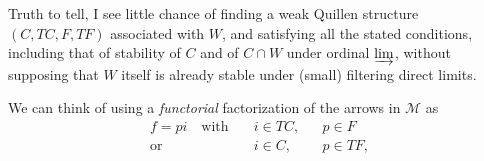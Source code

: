 \documentclass[11pt]{article}
\newcommand{\msp}[1]{\marginpar{\footnotesize [#1]}}
\newcommand{\cM}{\mathcal{M}}
\begin{document}
Truth to tell, I see little chance of finding a weak Quillen structure $(C,TC,F,TF)$ associated with $W$, and satisfying all the stated conditions, including that of stability of $C$ and of $C\cap W$ under ordinal $\varinjlim$, without supposing that $W$ itself is already stable under (small) filtering direct limits. %

\msp{page 41}
We can think of using a \textit{functorial} factorization of the arrows in $\cM$ as
\[
\begin{aligned}
f = pi \quad \text{with}\quad & i\in TC, && p\in F\\
\text{or}\quad & i\in C, && p\in TF,
\end{aligned}
\]
\end{document}
